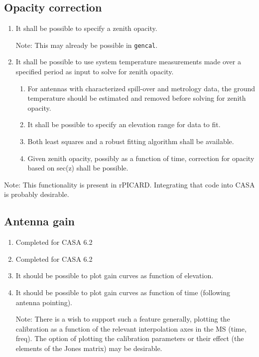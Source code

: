 \documentclass[11pt,a4paper]{article}
\begin{document}
\subsection{Opacity correction}

\begin{enumerate}[subseclist]

\item It shall be possible to specify a zenith opacity.

  Note: This may already be possible in \texttt{gencal}.

\item It shall be possible to use system temperature measurements made
  over a specified period as input to solve for zenith opacity.

  \begin{enumerate}[subsecsublist]

  \item For antennas with characterized spill-over and metrology data,
    the ground temperature should be estimated and removed before
    solving for zenith opacity.

  \item It shall be possible to specify an elevation range for data to
    fit.

  \item Both least squares and a robust fitting algorithm shall be available.

  \item Given zenith opacity, possibly as a function of time,
    correction for opacity based on sec(z) shall be possible.
    
  \end{enumerate}
  
\end{enumerate}

Note: This functionality is present in rPICARD.  Integrating that code
into CASA is probably desirable.


\subsection{Antenna gain}

\begin{enumerate}[subseclist]

\item Completed for CASA 6.2

\item Completed for CASA 6.2

\item It should be possible to plot gain curves as function of elevation.

\item It should be possible to plot gain curves as function of time
  (following antenna pointing).

  Note: There is a wish to support such a feature generally, plotting
  the calibration as a function of the relevant interpolation axes in
  the MS (time, freq).  The option of plotting the calibration
  parameters or their effect (the elements of the Jones matrix) may be
  desirable.

\end{enumerate}
\end{document}

